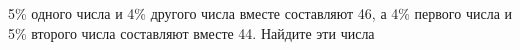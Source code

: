 \begin{ex}
	\begin{condition}
		5\% одного числа и 4\% другого числа вместе составляют 46, а 4\% первого числа и 5\% второго числа составляют вместе 44. Найдите эти числа
	\end{condition}
\end{ex}